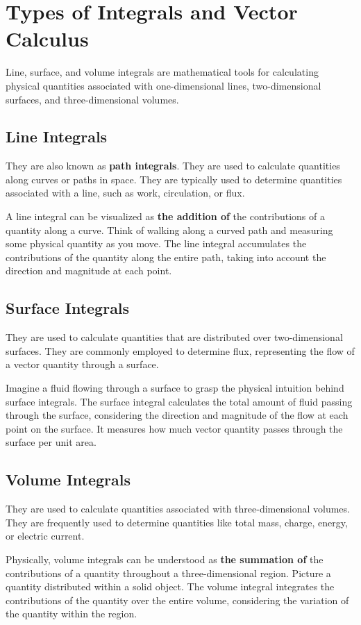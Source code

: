 \documentclass[12pt,b4paper]{article}
\begin{document}
\section*{Types of Integrals and Vector Calculus}
Line, surface, and volume integrals are mathematical tools for calculating physical quantities associated with one-dimensional lines, two-dimensional surfaces, and three-dimensional volumes. 
\thispagestyle{empty}
\subsection*{Line Integrals} 
They are also known as \textbf{path integrals}. They are used to calculate quantities along curves or paths in space. They are typically used to determine quantities associated with a line, such as work, circulation, or flux.

A line integral can be visualized as \textbf{the addition of} the contributions of a quantity along a curve. Think of walking along a curved path and measuring some physical quantity as you move. The line integral accumulates the contributions of the quantity along the entire path, taking into account the direction and magnitude at each point.
\subsection*{Surface Integrals}
They are used to calculate quantities that are distributed over two-dimensional surfaces. They are commonly employed to determine flux, representing the flow of a vector quantity through a surface.

Imagine a fluid flowing through a surface to grasp the physical intuition behind surface integrals. The surface integral calculates the total amount of fluid passing through the surface, considering the direction and magnitude of the flow at each point on the surface. It measures how much vector quantity passes through the surface per unit area.
\subsection*{Volume Integrals} 
They are used to calculate quantities associated with three-dimensional volumes. They are frequently used to determine quantities like total mass, charge, energy, or electric current.

Physically, volume integrals can be understood as \textbf{the summation of} the contributions of a quantity throughout a three-dimensional region. Picture a quantity distributed within a solid object. The volume integral integrates the contributions of the quantity over the entire volume, considering the variation of the quantity within the region.
\end{document}
